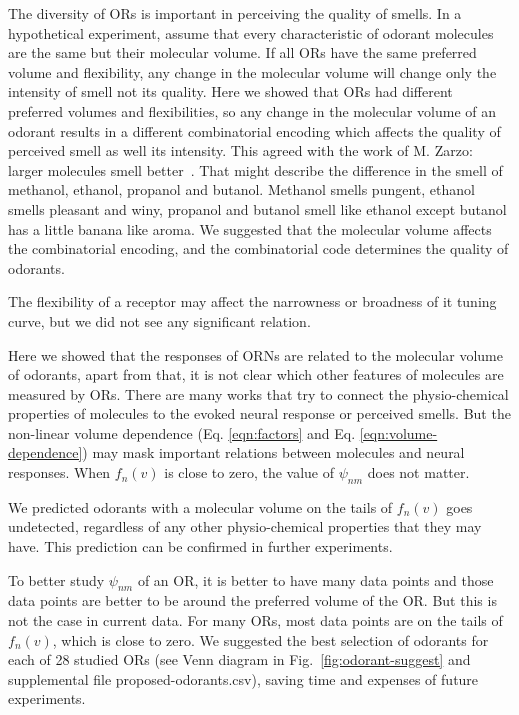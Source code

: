 \documentclass[11pt]{paper} %
\newcommand{\numberofreceptors}{ 28 }
\begin{document}
The diversity of ORs is important in perceiving the quality of smells. 
In a hypothetical experiment, 
assume that every characteristic of odorant molecules are the same but their molecular volume.
If all ORs  have the same preferred volume and flexibility, 
any change in the molecular volume will change only the intensity of smell not its quality.
Here we showed that ORs  had different preferred volumes and flexibilities, 
so any change in the molecular volume of an odorant results in a different combinatorial encoding which affects the quality of perceived smell as well its intensity.
This agreed with the work of M. Zarzo: larger molecules  smell better~\cite{zarzo2011}.
That might describe the difference in the smell of methanol, ethanol, propanol and butanol. 
Methanol smells pungent, ethanol smells pleasant and winy, propanol and butanol smell like ethanol except butanol has a little banana like aroma.
We suggested that the molecular volume affects the combinatorial encoding, 
and the combinatorial code determines the quality of odorants.

The flexibility of a receptor may affect the narrowness or broadness of it tuning curve, but we did not see any significant relation.

Here we showed that the responses of ORNs are related to the molecular volume of odorants, 
apart from that, it is not clear which other features of molecules are measured by ORs. 
There are many works that try to connect the physio-chemical properties of molecules to the evoked neural response or perceived smells.
But the non-linear volume dependence (Eq. \ref{eqn:factors} and Eq. \ref{eqn:volume-dependence})  
may mask important relations between molecules and neural responses.
When $f_n(v)$ is close to zero, 
the value of $\psi_{nm}$ does not matter. 

We predicted odorants with a molecular volume on the tails of $f_n(v)$ goes undetected, 
regardless of any other physio-chemical properties that they may have. 
This prediction can be confirmed in further experiments. 

To better study $\psi_{nm}$ of an OR, 
it is better to have many data points and those data points are better to be around the preferred volume of the OR.
But this is not the case in current data. 
For many ORs, 
most data points are on the tails of $f_n(v)$, which is close to zero.
We suggested the best selection of odorants for each of \numberofreceptors studied ORs 
(see Venn diagram in Fig.~\ref{fig:odorant-suggest} and supplemental file proposed-odorants.csv), 
saving time and expenses of future experiments. 
\end{document}

